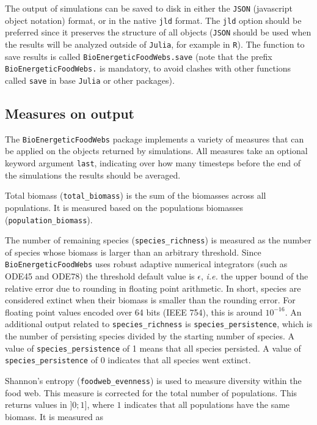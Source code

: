 \documentclass[12pt]{article}
\begin{document}
The output of simulations can be saved to disk in either the
\texttt{JSON} (javascript object notation) format, or in the native
\texttt{jld} format. The \texttt{jld} option should be preferred since
it preserves the structure of all objects (\texttt{JSON} should be used
when the results will be analyzed outside of \texttt{Julia}, for example
in \texttt{R}). The function to save results is called
\texttt{BioEnergeticFoodWebs.save} (note that the prefix
\texttt{BioEnergeticFoodWebs.} is mandatory, to avoid clashes with other
functions called \texttt{save} in base \texttt{Julia} or other
packages).

\subsection{Measures on output}\label{measures-on-output}

The \texttt{BioEnergeticFoodWebs} package implements a variety of
measures that can be applied on the objects returned by simulations. All
measures take an optional keyword argument \texttt{last}, indicating
over how many timesteps before the end of the simulations the results
should be averaged.

Total biomass (\texttt{total\_biomass}) is the sum of the biomasses
across all populations. It is measured based on the populations
biomasses (\texttt{population\_biomass}).

The number of remaining species (\texttt{species\_richness}) is measured
as the number of species whose biomass is larger than an arbitrary
threshold. Since \texttt{BioEnergeticFoodWebs} uses robust adaptive
numerical integrators (such as ODE45 and ODE78) the threshold default
value is \(\epsilon\), \emph{i.e.} the upper bound of the relative error
due to rounding in floating point arithmetic. In short, species are
considered extinct when their biomass is smaller than the rounding
error. For floating point values encoded over 64 bits (IEEE 754), this
is around \(10^{-16}\). An additional output related to
\texttt{species\_richness} is \texttt{species\_persistence}, which is
the number of persisting species divided by the starting number of
species. A value of \texttt{species\_persistence} of 1 means that all
species persisted. A value of \texttt{species\_persistence} of 0
indicates that all species went extinct.

Shannon's entropy (\texttt{foodweb\_evenness}) is used to measure
diversity within the food web. This measure is corrected for the total
number of populations. This returns values in \(]0;1]\), where \(1\)
indicates that all populations have the same biomass. It is measured as
\end{document}
